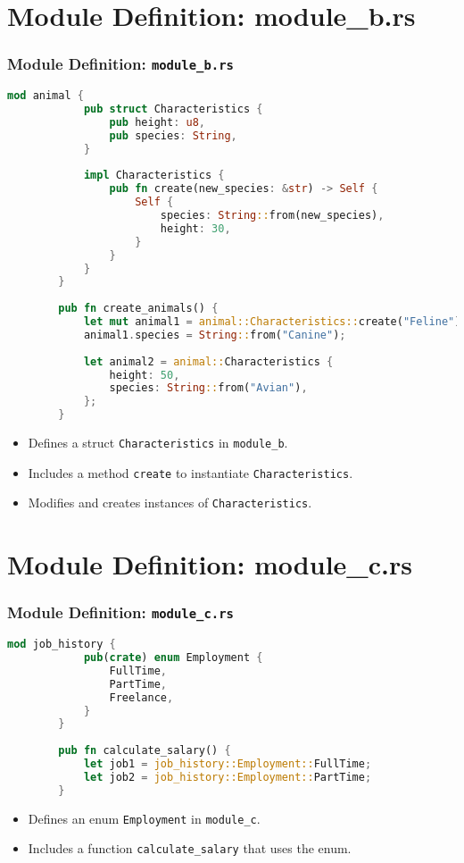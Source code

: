 \documentclass[aspectratio=169, table]{beamer}
\begin{document}
\section{Module Definition: module\_b.rs}
\begin{frame}[fragile]
	\frametitle{Module Definition: \texttt{module\_b.rs}}
	\begin{lstlisting}[language=Rust]
		mod animal {
			pub struct Characteristics {
				pub height: u8,
				pub species: String,
			}
			
			impl Characteristics {
				pub fn create(new_species: &str) -> Self {
					Self {
						species: String::from(new_species),
						height: 30,
					}
				}
			}
		}
		
		pub fn create_animals() {
			let mut animal1 = animal::Characteristics::create("Feline");
			animal1.species = String::from("Canine");
			
			let animal2 = animal::Characteristics {
				height: 50,
				species: String::from("Avian"),
			};
		}
	\end{lstlisting}
	\begin{itemize}
		\item Defines a struct \texttt{Characteristics} in \texttt{module\_b}.
		\item Includes a method \texttt{create} to instantiate \texttt{Characteristics}.
		\item Modifies and creates instances of \texttt{Characteristics}.
	\end{itemize}
\end{frame}

\section{Module Definition: module\_c.rs}
\begin{frame}[fragile]
	\frametitle{Module Definition: \texttt{module\_c.rs}}
	\begin{lstlisting}[language=Rust]
		mod job_history {
			pub(crate) enum Employment {
				FullTime,
				PartTime,
				Freelance,
			}
		}
		
		pub fn calculate_salary() {
			let job1 = job_history::Employment::FullTime;
			let job2 = job_history::Employment::PartTime;
		}
	\end{lstlisting}
	\begin{itemize}
		\item Defines an enum \texttt{Employment} in \texttt{module\_c}.
		\item Includes a function \texttt{calculate\_salary} that uses the enum.
	\end{itemize}
\end{frame}
\end{document}
